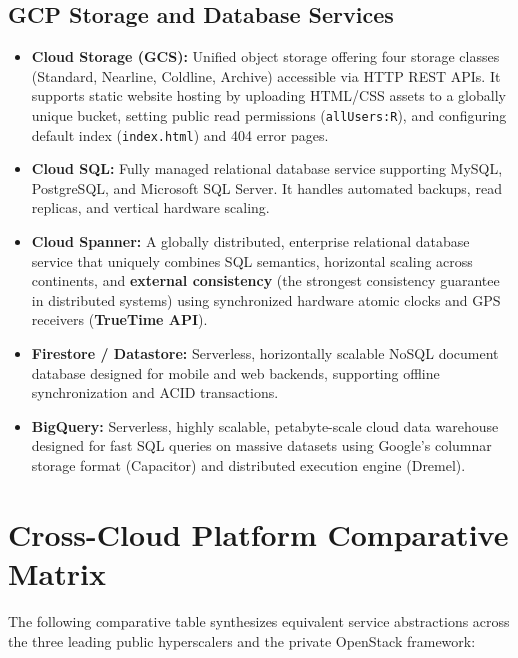 \subsection{GCP Storage and Database Services}
\begin{itemize}[leftmargin=*]
  \item \textbf{Cloud Storage (GCS):} Unified object storage offering four storage classes (Standard, Nearline, Coldline, Archive) accessible via HTTP REST APIs. It supports static website hosting by uploading HTML/CSS assets to a globally unique bucket, setting public read permissions (\texttt{allUsers:R}), and configuring default index (\texttt{index.html}) and 404 error pages.
  \item \textbf{Cloud SQL:} Fully managed relational database service supporting MySQL, PostgreSQL, and Microsoft SQL Server. It handles automated backups, read replicas, and vertical hardware scaling.
  \item \textbf{Cloud Spanner:} A globally distributed, enterprise relational database service that uniquely combines SQL semantics, horizontal scaling across continents, and \textbf{external consistency} (the strongest consistency guarantee in distributed systems) using synchronized hardware atomic clocks and GPS receivers (\textbf{TrueTime API}).
  \item \textbf{Firestore / Datastore:} Serverless, horizontally scalable NoSQL document database designed for mobile and web backends, supporting offline synchronization and ACID transactions.
  \item \textbf{BigQuery:} Serverless, highly scalable, petabyte-scale cloud data warehouse designed for fast SQL queries on massive datasets using Google's columnar storage format (Capacitor) and distributed execution engine (Dremel).
\end{itemize}

\section{Cross-Cloud Platform Comparative Matrix}
The following comparative table synthesizes equivalent service abstractions across the three leading public hyperscalers and the private OpenStack framework:

